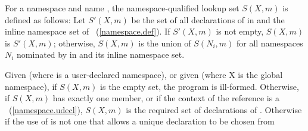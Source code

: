 \pnum
For a namespace  and name , the namespace-qualified lookup set
$S(X, m)$ is defined as follows: Let $S'(X, m)$ be the set of all
declarations of  in  and the inline namespace set of
~(\ref{namespace.def}). If $S'(X, m)$ is not empty, $S(X, m)$
is $S'(X, m)$; otherwise, $S(X, m)$ is the union of $S(N_i, m)$ for
all namespaces $N_i$ nominated by  in
 and its inline namespace set.

\pnum
Given  (where  is a user-declared namespace), or
given  (where X is the global namespace), if
$S(X, m)$ is the empty set, the program is ill-formed. Otherwise, if
$S(X, m)$ has exactly one member, or if the context of the reference is
a ~(\ref{namespace.udecl}), $S(X, m)$
is the
required set of declarations of . Otherwise if the use of
 is not one that allows a unique declaration to be chosen from
